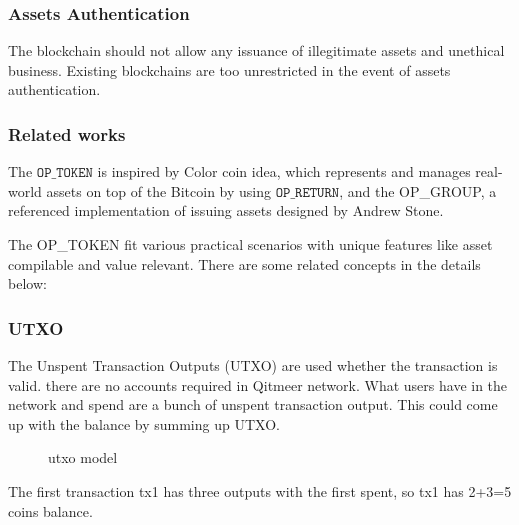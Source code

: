 \documentclass[a4paper,11pt]{article}
\begin{document}
\subsubsection*{Assets Authentication}
The blockchain should not allow any issuance of illegitimate assets and unethical business. Existing blockchains are too unrestricted in the event of assets authentication.

\subsubsection{Related works}

The $\texttt{OP\_TOKEN}$ is inspired by Color coin idea, which represents and manages real-world assets on top of the Bitcoin by using $\texttt{OP\_RETURN}$, and the OP\_GROUP, a referenced implementation of issuing assets designed by Andrew Stone.

The OP\_TOKEN fit various practical scenarios with unique features like asset compilable and value relevant. There are some related concepts in the details below:

\subsubsection*{UTXO}

The Unspent Transaction Outputs (UTXO) are used whether the transaction is valid. there are no accounts required in Qitmeer network. What users have in the network and spend are a bunch of unspent transaction output. This could come up with the balance by summing up UTXO.

\begin{figure}[hbt]
	\centerline{%
	}
\caption{utxo model}
\end{figure}

The first transaction tx1 has three outputs with the first spent, so  tx1 has 2+3=5 coins balance.
\end{document}
